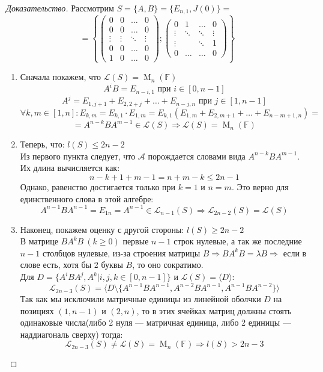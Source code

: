 \documentclass[a4paper, 14pt]{extarticle}
\theoremstyle{definition}
\begin{document}
\begin{proof}[Доказательство]
	Рассмотрим \(S = \{A, B\} = \{E_{n, 1}, J(0)\} = \)
	\[ = \left\{ \left(
		\begin{array}{cccc}
			0 & 0 & \hdots & 0 \\
			0 & 0 & \hdots & 0 \\
			\vdots & \vdots & \ddots & \vdots \\
			0 & 0 & \hdots & 0 \\
			1 & 0 & \hdots & 0
		\end{array} \right); 
		\left(
			\begin{array}{cccc}
				0 & 1 & \hdots & 0 \\
				\vdots & \ddots & \ddots & \vdots \\
				\vdots & & \ddots & 1 \\
				0 & \hdots & \hdots & 0
			\end{array}
		\right)
		 \right\}\]
		 
		 \begin{enumerate}
		 	\item Сначала покажем, что \(\mathcal{L}(S) = \operatorname{M}_n(\mathbb{F})\)
		 	\[A^iB = E_{n - i, 1} \text{ при } i \in [0, n - 1]\]
		 	\[A^j = E_{1, j + 1} + E_{2, 2 +j} + \dots + E_{n - j, n} \text{ при } j \in [1, n - 1]\]
		 	\[\forall k, m \in [1, n] : E_{k,m} = E_{k,1} \cdot E_{1, m} = E_{k, 1}(E_{1,m} + E_{2, m + 1} + \dots + E_{n - m + 1, n}) =\] \[= A^{n - k}BA^{m - 1} \in \mathcal{L}(S) \Rightarrow \mathcal{L}(S) = \operatorname{M}_n(\mathbb{F})\]
		 	\item Теперь, что: \(l(S) \leqslant 2n - 2\)\\
		 	Из первого пункта следует, что \(\mathcal{A}\) порождается словами вида \(A^{n - k}BA^{m - 1}\). Их длина вычисляется как:
		 	\[n - k + 1 + m - 1 = n + m - k \leqslant 2n - 1\]
		 	Однако, равенство достигается только при \(k = 1\) и \(n = m\). Это верно для единственного слова в этой алгебре: 
		 	\[A^{n - 1}BA^{n - 1} = E_{1n} = A^{n - 1} \in \mathcal{L}_{n - 1}(S) \Rightarrow \mathcal{L}_{2n - 2}(S) =\mathcal{L}(S)\]
		 	\item Наконец, покажем оценку с другой стороны: \(l(S) \geqslant 2n - 2\)\\
		 	В матрице \(BA^kB\ (k \geqslant 0)\) первые \(n - 1\) строк нулевые, а так же последние \(n - 1\) столбцов нулевые, из-за строения матрицы \(B \Rightarrow BA^kB = \lambda B \Rightarrow\) если в слове есть, хотя бы 2 буквы \(B\), то оно сократимо.\\
		 	Для \(D = \{A^iBA^j, A^k | i, j, k \in [0, n - 1]\} \text{ и } \mathcal{L}(S) = \langle D \rangle:\)
		 	\[\mathcal{L}_{2n - 3}(S) = \langle D \setminus \{A^{n - 1}BA^{n - 1}, A^{n - 2}BA^{n - 1}, A^{n - 1}BA^{n - 2}\} \rangle\]
		 	Так как мы исключили матричные единицы из линейной оболчки \(D\) на позициях \((1, n - 1) \) и \((2, n)\), то в этих ячейках матриц должны стоять одинаковые числа(либо 2 нуля --- матричная единица, либо 2 единицы --- наддиагональ сверху) тогда:
		 	 \[\mathcal{L}_{2n - 3}(S) \neq \mathcal{L}(S) = \operatorname{M}_{n}(\mathbb{F}) \Rightarrow l(S) > 2n - 3\]
		 \end{enumerate}
\end{proof}
\end{document}

